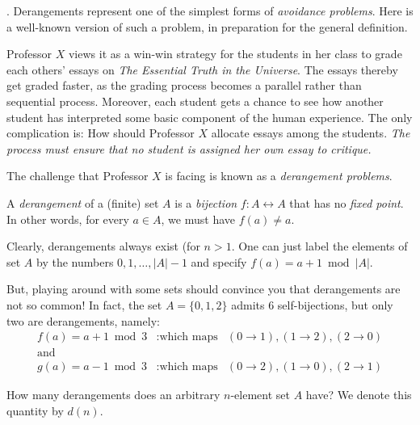 \bigskip

 

.
Derangements represent one of the simplest forms of {\em avoidance problems}.  Here is a
well-known version of such a problem, in preparation for the general definition.

\smallskip

Professor $X$ views it as a win-win strategy for the students in her class to grade each others' essays on {\it The Essential Truth in the Universe}.  The essays thereby get graded faster, as the grading process becomes a parallel rather than sequential process.  Moreover, each student gets a chance to see how another student has interpreted some basic component of the human experience.  The only complication is: How should Professor $X$  allocate essays among the students.  {\em The process must ensure that no student is assigned her own essay to critique.}

\smallskip

The challenge that Professor $X$ is facing is known as a {\em derangement problems}.

\bigskip

\noindent 
A {\em derangement} of a (finite) set $A$ is a {\em bijection} $f: A \leftrightarrow A$ that has no 
{\em fixed point}.  In other words, for every $a \in A$, we must have $f(a) \neq a$.

\medskip

Clearly, derangements always exist (for $n>1$.  One can just label the elements of set $A$ by the numbers
$0, 1, \ldots, |A|-1$ and specify $f(a) = a+1 \bmod |A|$.

\medskip

But, playing around with some sets should convince you that derangements are not so common!
In fact, the set  $A = \{0, 1,2 \}$ admits $6$ self-bijections, but only two are derangements, namely:
\[
\begin{array}{lll}
f(a) = a+1 \bmod 3 &: \mbox{which maps} &(0 \rightarrow 1),  (1 \rightarrow 2), (2 \rightarrow 0) \\
\mbox{and} &  & \\
g(a) = a-1 \bmod 3 &: \mbox{which maps} & (0 \rightarrow 2),  (1 \rightarrow 0), (2 \rightarrow 1)
\end{array}
\]

\medskip

How many derangements does an arbitrary $n$-element set $A$ have?   We denote this quantity by $d(n)$.

